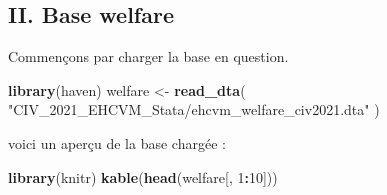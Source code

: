 \documentclass[
]{article}
\newenvironment{Shaded}{\begin{snugshade}}{\end{snugshade}}
\newcommand{\DecValTok}[1]{\textcolor[rgb]{0.00,0.00,0.81}{#1}}
\newcommand{\FunctionTok}[1]{\textcolor[rgb]{0.13,0.29,0.53}{\textbf{#1}}}
\newcommand{\NormalTok}[1]{#1}
\newcommand{\OtherTok}[1]{\textcolor[rgb]{0.56,0.35,0.01}{#1}}
\newcommand{\SpecialCharTok}[1]{\textcolor[rgb]{0.81,0.36,0.00}{\textbf{#1}}}
\newcommand{\StringTok}[1]{\textcolor[rgb]{0.31,0.60,0.02}{#1}}
\begin{document}
\newpage

\subsection{II. Base welfare}\label{ii.-base-welfare}

Commençons par charger la base en question.

\begin{Shaded}
\begin{Highlighting}[]
\FunctionTok{library}\NormalTok{(haven)}
\NormalTok{welfare }\OtherTok{\textless{}{-}} \FunctionTok{read\_dta}\NormalTok{(}
  \StringTok{"CIV\_2021\_EHCVM\_Stata/ehcvm\_welfare\_civ2021.dta"}
\NormalTok{  )}
\end{Highlighting}
\end{Shaded}

voici un aperçu de la base chargée :

\begin{Shaded}
\begin{Highlighting}[]
\FunctionTok{library}\NormalTok{(knitr)}
\FunctionTok{kable}\NormalTok{(}\FunctionTok{head}\NormalTok{(welfare[, }\DecValTok{1}\SpecialCharTok{:}\DecValTok{10}\NormalTok{]))}
\end{Highlighting}
\end{Shaded}
\end{document}

